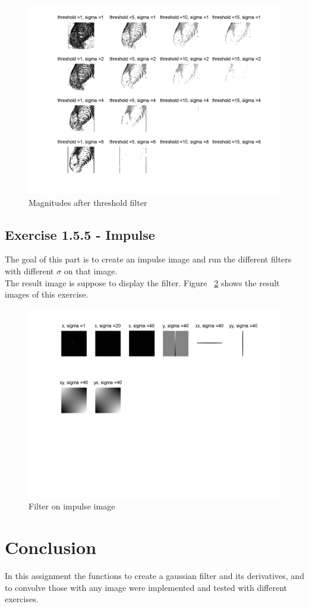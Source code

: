 \documentclass[11pt]{article}
\begin{document}
\begin{figure}[h!]
\includegraphics[scale=0.6]{threshold.png}
\caption{Magnitudes after threshold filter}
\label{threshold}
\end{figure}

\subsection{Exercise 1.5.5 - Impulse}
The goal of this part is to create an impulse image and run the different filters with different $\sigma$ on that image.\\
The result image is suppose to display the filter. Figure ~\ref{impulse} shows the result images of this exercise.

\begin{figure}[h!]
\includegraphics[scale=0.6]{impulse.png}
\caption{Filter on impulse image}
\label{impulse}
\end{figure}

\section{Conclusion}
In this assignment the functions to create a gaussian filter and its derivatives, and to convolve those with any image were implemented and tested with different exercises. 
\end{document}
